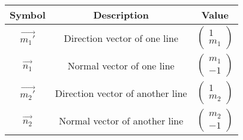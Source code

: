     \begin{tabular}{|c|c|c|}
    \hline
        \textbf{Symbol} &\textbf{Description}&\textbf{Value}  \\
        \hline
         $\vec{m_1'}$&Direction vector of one line&$\begin{pmatrix}
             1\\m_1
         \end{pmatrix}$\\
         \hline
         $\vec{n_1}$&Normal vector of one line&$\begin{pmatrix}
             m_1\\-1
         \end{pmatrix}$\\
         \hline
        $\vec{m_2'}$&Direction vector of another line&$\begin{pmatrix}
             1\\m_2
         \end{pmatrix}$\\
         \hline
          $\vec{n_2}$&Normal vector of another line&$\begin{pmatrix}
             m_2\\-1
         \end{pmatrix}$\\
         \hline
    \end{tabular}
